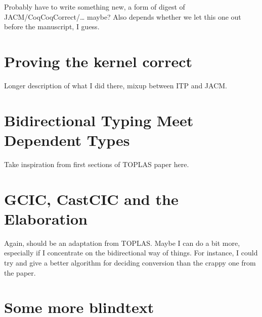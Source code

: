 \documentclass[
  french,english,
	fontsize=10pt, %
	twoside=true, %
	secnumdepth=1, %
]{kaobook/kaobook}
\begin{document}
Probably have to write something new, a form of digest of JACM/CoqCoqCorrect/… maybe? Also
depends whether we let this one out before the manuscript, I guess.

\chapter{Proving the kernel correct}

Longer description of what I did there, mixup between ITP and JACM.

\label{part:gradual-typing}

\chapter{Bidirectional Typing Meet Dependent Types}

Take inspiration from first sections of TOPLAS paper here.

\chapter{GCIC, CastCIC and the Elaboration}

Again, should be an adaptation from TOPLAS. Maybe I can do a bit more, especially if
I concentrate on the bidirectional way of things. For instance, I could try and give a
better algorithm for deciding conversion than the crappy one from the paper.

\appendix %


\chapter{Some more blindtext}

\blindtext


\backmatter %

\end{document}
